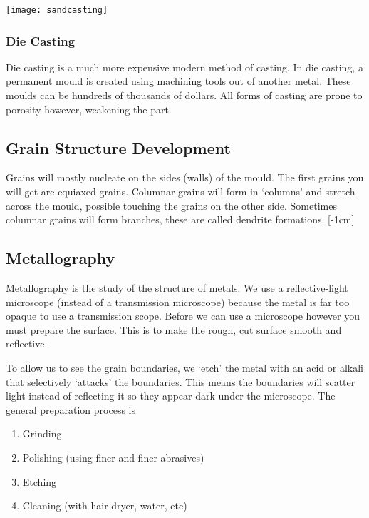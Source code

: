 \documentclass[12pt]{article}
\begin{document}
\begin{center}
\texttt{[image: sandcasting]}
\end{center}
\subsubsection{Die Casting}
Die casting is a much more expensive modern method of casting.
In die casting, a permanent mould is created using machining tools out of another metal.
These moulds can be hundreds of thousands of dollars.
All forms of casting are prone to porosity however, weakening the part.

\subsection{Grain Structure Development}
Grains will mostly nucleate on the sides (walls) of the mould.
The first grains you will get are equiaxed grains.
Columnar grains will form in `columns' and stretch across the mould, possible touching the grains on the other side.
Sometimes columnar grains will form branches, these are called dendrite formations.
[-1cm]

\subsection{Metallography} 
Metallography is the study of the structure of metals. 
We use a reflective-light microscope (instead of a transmission microscope) because the metal is far too opaque to use a transmission scope.
Before we can use a microscope however you must prepare the surface.
This is to make the rough, cut surface smooth and reflective.

To allow us to see the grain boundaries, we `etch' the metal with an acid or alkali that selectively `attacks' the boundaries.
This means the boundaries will scatter light instead of reflecting it so they appear dark under the microscope. 
The general preparation process is

\begin{enumerate}
  \item Grinding
  \item Polishing (using finer and finer abrasives)
  \item Etching
  \item Cleaning (with hair-dryer, water, etc)
\end{enumerate}
\end{document}
